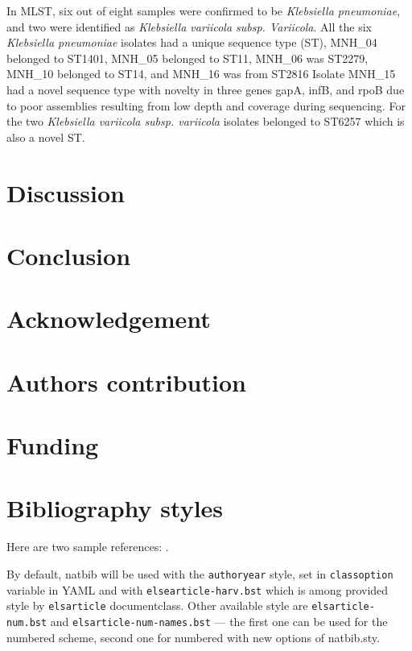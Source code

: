 \documentclass[preprint, 3p,
authoryear]{elsarticle} %
\begin{document}
In MLST, six out of eight samples were confirmed to be \emph{Klebsiella
pneumoniae}, and two were identified as \emph{Klebsiella variicola
subsp. Variicola}. All the six \emph{Klebsiella pneumoniae} isolates had
a unique sequence type (ST), MNH\_04 belonged to ST1401, MNH\_05
belonged to ST11, MNH\_06 was ST2279, MNH\_10 belonged to ST14, and
MNH\_16 was from ST2816 Isolate MNH\_15 had a novel sequence type with
novelty in three genes gapA, infB, and rpoB due to poor assemblies
resulting from low depth and coverage during sequencing. For the two
\emph{Klebsiella variicola subsp. variicola} isolates belonged to ST6257
which is also a novel ST.

\section{Discussion}\label{discussion}

\section{Conclusion}\label{conclusion}

\section{Acknowledgement}\label{acknowledgement}

\section{Authors contribution}\label{authors-contribution}

\section{Funding}\label{funding}

\section{Bibliography styles}\label{bibliography-styles}

Here are two sample references: \citeauthor{Feynman1963118}
\citetext{\citeyear{Feynman1963118}; \citealp{Dirac1953888}}.

By default, natbib will be used with the \texttt{authoryear} style, set
in \texttt{classoption} variable in YAML and with
\texttt{elsearticle-harv.bst} which is among provided style by
\texttt{elsarticle} documentclass. Other available style are
\texttt{elsarticle-num.bst} and \texttt{elsarticle-num-names.bst} ---
the first one can be used for the numbered scheme, second one for
numbered with new options of natbib.sty.
\end{document}
